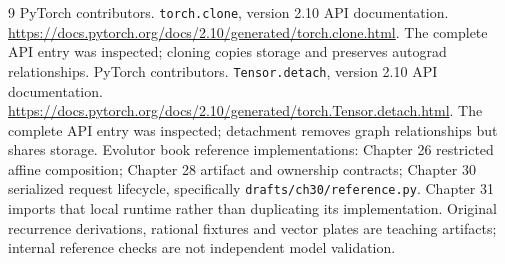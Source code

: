 \begin{thebibliography}{9}
 PyTorch contributors.
\texttt{torch.clone}, version 2.10 API documentation.
\url{https://docs.pytorch.org/docs/2.10/generated/torch.clone.html}.
The complete API entry was inspected; cloning copies storage and preserves autograd relationships.
 PyTorch contributors.
\texttt{Tensor.detach}, version 2.10 API documentation.
\url{https://docs.pytorch.org/docs/2.10/generated/torch.Tensor.detach.html}.
The complete API entry was inspected; detachment removes graph relationships but shares storage.
 Evolutor book reference implementations:
Chapter 26 restricted affine composition; Chapter 28 artifact and ownership
contracts; Chapter 30 serialized request lifecycle, specifically
\texttt{drafts/ch30/reference.py}.
Chapter 31 imports that local runtime rather than duplicating its implementation.
Original recurrence derivations, rational fixtures and vector plates are teaching
artifacts; internal reference checks are not independent model validation.
\end{thebibliography}
